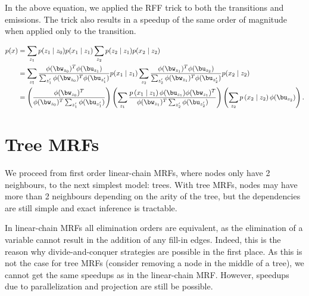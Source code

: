 \documentclass{article}
\begin{document}
In the above equation, we applied the RFF trick to both the transitions and emissions.
The trick also results in a speedup of the same order of magnitude when
applied only to the transition.

\begin{equation}
\begin{aligned}
p(x)
&= \sum_{z_1} p(z_1 \mid z_0)p(x_1 \mid z_1)  \sum_{z_2} p(z_2 \mid z_1)p(x_2 \mid z_2)\\
&= \sum_{z_1} \frac{\phi(\bw_{z_0})^T\phi(\bu_{z_1})}{\sum_{z_1'}\phi(\bw_{z_0})^T\phi(\bu_{z'_1})}
p(x_1 \mid z_1)
\sum_{z_2} \frac{\phi(\bw_{z_1})^T\phi(\bu_{z_2})}{\sum_{z_2'}\phi(\bw_{z_1})^T\phi(\bu_{z_2'})}
p(x_2 \mid z_2)\\
&= \left(\frac{\phi(\bw_{z_0})^T}{\phi(\bw_{z_0})^T\sum_{z_1'}\phi(\bu_{z'_1})}\right)
\left(
\sum_{z_1} 
\frac{p\left(x_1 \mid z_1\right)\phi(\bu_{z_1})\phi(\bw_{z_1})^T}
{
    \phi(\bw_{z_1})^T\sum_{z_2'}\phi(\bu_{z_2'})
}
\right)
\left(
\sum_{z_2} 
p\left(x_2 \mid z_2\right)\phi(\bu_{z_2})
\right).
\end{aligned}
\end{equation}

\section{Tree MRFs}
We proceed from first order linear-chain MRFs, where nodes only have 2 neighbours,
to the next simplest model: trees.
With tree MRFs, nodes may have more than 2 neighbours depending on the arity of the tree,
but the dependencies are still simple and exact inference is tractable.

In linear-chain MRFs all elimination orders are equivalent, as the elimination 
of a variable cannot result in the addition of any fill-in edges.
Indeed, this is the reason why divide-and-conquer strategies are possible
in the first place.
As this is not the case for tree MRFs (consider removing a node in the middle of a tree),
we cannot get the same speedups as in the linear-chain MRF.
However, speedups due to parallelization and projection are still be possible.
\end{document}

